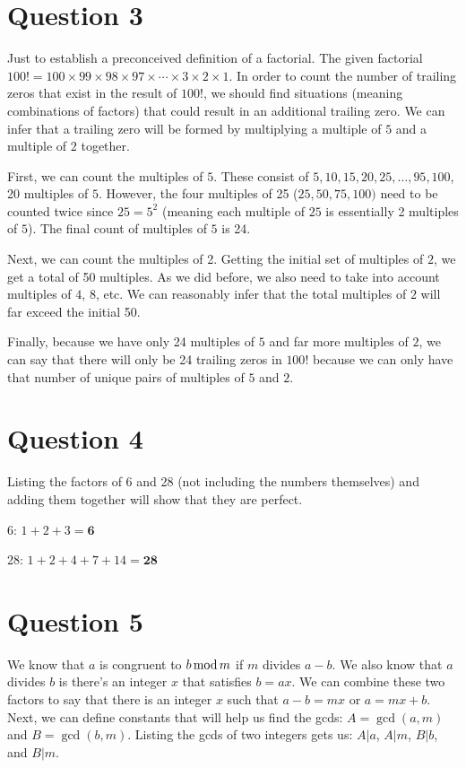 \documentclass[11pt]{article}
\begin{document}
\section*{Question 3}
Just to establish a preconceived definition of a factorial. The given factorial $100! = 100 \times 99 \times 98 \times 97 \times \cdots \times 3 \times 2 \times 1$. In order to count the number of trailing zeros that exist in the result of $100!$, we should find situations (meaning combinations of factors) that could result in an additional trailing zero. We can infer that a trailing zero will be formed by multiplying a multiple of $5$ and a multiple of $2$ together.

First, we can count the multiples of $5$. These consist of $5, 10, 15, 20, 25,\ldots, 95, 100$, 20 multiples of $5$. However, the four multiples of 25 ($25, 50, 75, 100)$ need to be counted twice since $25=5^2$ (meaning each multiple of $25$ is essentially 2 multiples of $5$). The final count of multiples of $5$ is 24.

Next, we can count the multiples of 2. Getting the initial set of multiples of $2$, we get a total of 50 multiples. As we did before, we also need to take into account multiples of $4$, $8$, etc. We can reasonably infer that the total multiples of $2$ will far exceed the initial 50.

Finally, because we have only 24 multiples of $5$ and far more multiples of $2$, we can say that there will only be 24 trailing zeros in $100!$ because we can only have that number of unique pairs of multiples of $5$ and $2$.

\section*{Question 4}
Listing the factors of 6 and 28 (not including the numbers themselves) and adding them together will show that they are perfect.

6: $1+2+3=\textbf{6}$

28: $1+2+4+7+14=\textbf{28}$

\section*{Question 5}
We know that $a$ is congruent to $b \mathinner{\text{mod}} m$ if $m$ divides $a-b$. We also know that $a$ divides $b$ is there's an integer $x$ that satisfies $b = ax$. We can combine these two factors to say that there is an integer $x$ such that $a - b = mx$ or $a = mx + b$. Next, we can define constants that will help us find the gcds: $A = \gcd(a, m)$ and $B = \gcd(b,m)$. Listing the gcds of two integers gets us: $A|a$, $A|m$, $B|b$, and $B|m$.
\end{document}
